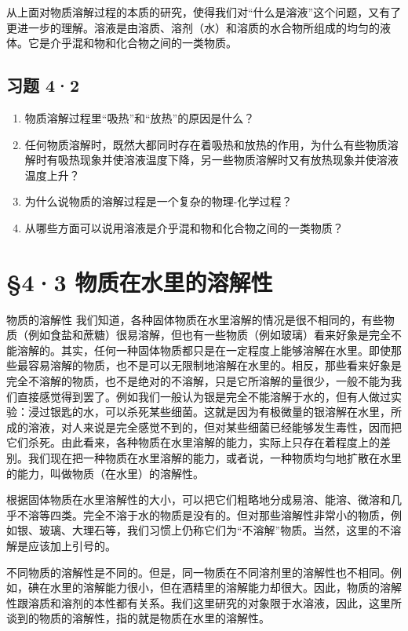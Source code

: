 从上面对物质溶解过程的本质的研究，使得我们对``什么是溶液''这个问题，又有了更进一步的理解。溶液是由溶质、溶剂（水）和溶质的水合物所组成的均匀的液体。它是介乎混和物和化合物之间的一类物质。

\subsection{习题 4·2}

\begin{enumerate}
\item
  物质溶解过程里``吸热''和``放热''的原因是什么？
\item
  任何物质溶解时，既然大都同时存在着吸热和放热的作用，为什么有些物质溶解时有吸热现象并使溶液温度下降，另一些物质溶解时又有放热现象并使溶液温度上升？
\item
  为什么说物质的溶解过程是一个复杂的物理-化学过程？
\item
  从哪些方面可以说用溶液是介乎混和物和化合物之间的一类物质？
\end{enumerate}

\section{§4·3 物质在水里的溶解性}

物质的溶解性
我们知道，各种固体物质在水里溶解的情况是很不相同的，有些物质（例如食盐和蔗糖）很易溶解，但也有一些物质（例如玻璃）看来好象是完全不能溶解的。其实，任何一种固体物质都只是在一定程度上能够溶解在水里。即使那些最容易溶解的物质，也不是可以无限制地溶解在水里的。相反，那些看来好象是完全不溶解的物质，也不是绝对的不溶解，只是它所溶解的量很少，一般不能为我们直接感觉得到罢了。例如我们一般认为银是完全不能溶解于水的，但有人做过实验：浸过银匙的水，可以杀死某些细菌。这就是因为有极微量的银溶解在水里，所成的溶液，对人来说是完全感觉不到的，但对某些细菌已经能够发生毒性，因而把它们杀死。由此看来，各种物质在水里溶解的能力，实际上只存在着程度上的差别。我们现在把一种物质在水里溶解的能力，或者说，一种物质均匀地扩散在水里的能力，叫做物质（在水里）的溶解性。

根据固体物质在水里溶解性的大小，可以把它们粗略地分成易溶、能溶、微溶和几乎不溶等四类。完全不溶于水的物质是没有的。但对那些溶解性非常小的物质，例如银、玻璃、大理石等，我们习惯上仍称它们为``不溶解''物质。当然，这里的不溶解是应该加上引号的。

不同物质的溶解性是不同的。但是，同一物质在不同溶剂里的溶解性也不相同。例如，碘在水里的溶解能力很小，但在酒精里的溶解能力却很大。因此，物质的溶解性跟溶质和溶剂的本性都有关系。我们这里研究的对象限于水溶液，因此，这里所谈到的物质的溶解性，指的就是物质在水里的溶解性。

